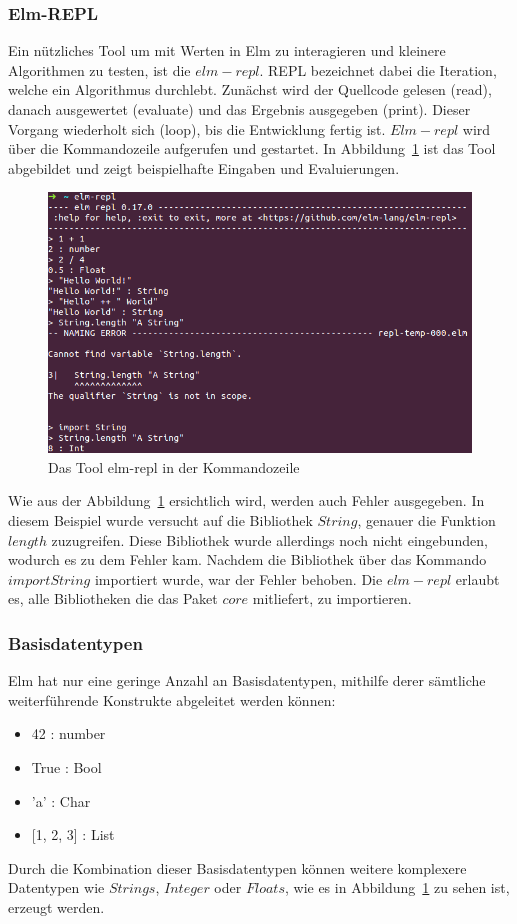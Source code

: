 \subsubsection{Elm-REPL}
\label{sec:elm-repl}
Ein nützliches Tool um mit Werten in Elm zu interagieren und kleinere Algorithmen zu testen, ist die $elm-repl$. \ac{REPL} bezeichnet dabei die Iteration, welche ein Algorithmus durchlebt. Zunächst wird der Quellcode gelesen (read), danach ausgewertet (evaluate) und das Ergebnis ausgegeben (print). Dieser Vorgang wiederholt sich (loop), bis die Entwicklung fertig ist. $Elm-repl$ wird über die Kommandozeile aufgerufen und gestartet. In Abbildung~\ref{fig:elm-repl} ist das Tool abgebildet und zeigt beispielhafte Eingaben und Evaluierungen.
\begin{figure}[h]
\centering
\includegraphics[scale=0.5]{img/elm-repl.png}
\caption{Das Tool elm-repl in der Kommandozeile}\label{fig:elm-repl}
\end{figure}
Wie aus der Abbildung~\ref{fig:elm-repl} ersichtlich wird, werden auch Fehler ausgegeben. In diesem Beispiel wurde versucht auf die Bibliothek $String$, genauer die Funktion $length$ zuzugreifen. Diese Bibliothek wurde allerdings noch nicht eingebunden, wodurch es zu dem Fehler kam. Nachdem die Bibliothek über das Kommando $import String$ importiert wurde, war der Fehler behoben. Die $elm-repl$ erlaubt es, alle Bibliotheken die das Paket $core$ mitliefert, zu importieren.

\subsubsection{Basisdatentypen}
\label{sec:Basisdatentypen}
Elm hat nur eine geringe Anzahl an Basisdatentypen, mithilfe derer sämtliche weiterführende Konstrukte abgeleitet werden können:
\begin{itemize}
	\item 42 : number
	\item True : Bool
	\item 'a' : Char
	\item {[1, 2, 3] : List}
\end{itemize}
Durch die Kombination dieser Basisdatentypen können weitere komplexere Datentypen wie $Strings$, $Integer$ oder $Floats$, wie es in Abbildung~\ref{fig:elm-repl} zu sehen ist, erzeugt werden.

